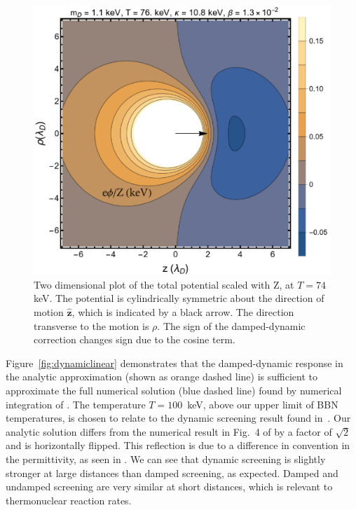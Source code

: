 \begin{figure} 
 \centerline{\includegraphics[width=.90\linewidth]{plots/chap03BBN/Pot_2DPlotFix.png}}
 \caption{Two dimensional plot of the total potential  scaled with Z, at $T=74\,$keV. The potential is cylindrically symmetric about the direction of motion $\boldsymbol{\hat{z}}$, which is indicated by a black arrow. The direction transverse to the motion is $\rho$. The sign of the damped-dynamic correction  changes sign due to the cosine term. }
 \label{fig:numericalComp}
\end{figure} 

Figure~\ref{fig:dynamiclinear} demonstrates that the damped-dynamic response in the analytic approximation  (shown as orange dashed line) is sufficient to approximate the full numerical solution (blue dashed line) found by numerical integration of . The temperature $T = 100$\, keV, above our upper limit of BBN temperatures, is chosen to relate to the dynamic screening result found in~\cite{Hwang:2021kno}. Our analytic solution differs from the numerical result in Fig.~4 of \cite{Hwang:2021kno} by a factor of $\sqrt{2}$ and is horizontally flipped. This reflection is due to a difference in convention in the permittivity, as seen in . We can see that dynamic screening is slightly stronger at large distances than damped screening, as expected. Damped and undamped screening are very similar at short distances, which is relevant to thermonuclear reaction rates. 

